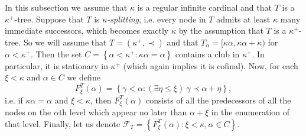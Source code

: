 \documentclass{amsart}
\theoremstyle{plain}
\theoremstyle{definition}
\numberwithin{equation}{section}
\renewcommand{\a}{\alpha}
\newcommand{\g}{\gamma}
\renewcommand{\k}{\kappa}
\newcommand{\set}[1]{\left\{#1\right\}}
\begin{document}
In this subsection we assume that $\k$ is a regular infinite cardinal and that $T$ is a $\k^+$-tree.
Suppose that $T$ is \emph{$\k$-splitting}, i.e. every node in $T$ admits at least $\k$ many immediate successors, which becomes exactly $\k$ by the assumption that $T$ is a $\k^+$-tree.
So we will assume that $T=(\k^+,\prec)$ and that $T_{\a}=[\k\a,\k\a+\k)$ for $\a<\k^+$.
Then the set $C=\set{\a<\k^+:\k\a=\a}$ contains a club in $\k^+$.
In particular, it is stationary in $\k^+$ (which again implies it is cofinal).
Now, for each $\xi < \k$ and $\a\in C$ we define $$F^T_{\xi}(\a)=\set{\g<\a:(\exists \eta\le\xi)\ \g\prec \a+\eta},$$ i.e. if $\k\a=\a$ and $\xi<\k$, then $F^T_{\xi}(\a)$ consists of all the predecessors of all the nodes on the $\a$th level which appear no later than $\a+\xi$ in the enumeration of that level.
Finally, let us denote $\mathcal F_T=\set{F^T_{\xi}(\a):\xi<\k,\a\in C}$.
\end{document}
